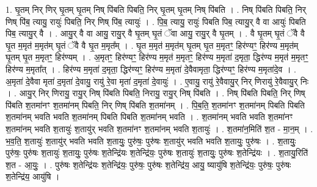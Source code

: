 \documentclass[17pt]{extarticle}
\begin{document}
1. घृ॒तम् निर् णिर् घृ॒तम् घृ॒तम् निष् पि॑बति पिबति॒ निर् घृ॒तम् घृ॒तम् निष् पि॑बति । . निष् पि॑बति पिबति॒ निर् णिष् पि॑ब॒ त्यायु॒ रायुः॑ पिबति॒ निर् णिष् पि॑ब॒ त्यायुः॑ । . पि॒ब॒ त्यायु॒ रायुः॑ पिबति पिब॒ त्यायु॒र् वै वा आयुः॑ पिबति पिब॒ त्यायु॒र् वै । . आयु॒र् वै वा आयु॒ रायु॒र् वै घृ॒तम् घृ॒तं ॅवा आयु॒ रायु॒र् वै घृ॒तम् । . वै घृ॒तम् घृ॒तं ॅवै वै घृ॒त म॒मृत॑ म॒मृत॑म् घृ॒तं ॅवै वै घृ॒त म॒मृत᳚म् । . घृ॒त म॒मृत॑ म॒मृत॑म् घृ॒तम् घृ॒त म॒मृतꣳ॒॒ हिर॑ण्यꣳ॒॒ हिर॑ण्य म॒मृत॑म् घृ॒तम् घृ॒त म॒मृतꣳ॒॒ हिर॑ण्यम् । . अ॒मृतꣳ॒॒ हिर॑ण्यꣳ॒॒ हिर॑ण्य म॒मृत॑ म॒मृतꣳ॒॒ हिर॑ण्य म॒मृता॑ द॒मृता॒ द्धिर॑ण्य म॒मृत॑ म॒मृतꣳ॒॒ हिर॑ण्य म॒मृता᳚त् । . हिर॑ण्य म॒मृता॑ द॒मृता॒ द्धिर॑ण्यꣳ॒॒ हिर॑ण्य म॒मृता॑ दे॒वैवामृता॒ द्धिर॑ण्यꣳ॒॒ हिर॑ण्य म॒मृता॑दे॒व । . अ॒मृता॑ दे॒वैवा मृता॑ द॒मृता॑ दे॒वायु॒ रायु॑ रे॒वा मृता॑ द॒मृता॑ दे॒वायुः॑ । . ए॒वायु॒ रायु॑ रे॒वैवायु॒र् निर् णिरायु॑ रे॒वैवायु॒र् निः । . आयु॒र् निर् णिरायु॒ रायु॒र् निष् पि॑बति पिबति॒ निरायु॒ रायु॒र् निष् पि॑बति । . निष् पि॑बति पिबति॒ निर् णिष् पि॑बति श॒तमा॑नꣳ श॒तमा॑नम् पिबति॒ निर् णिष् पि॑बति श॒तमा॑नम् । . पि॒ब॒ति॒ श॒तमा॑नꣳ श॒तमा॑नम् पिबति पिबति श॒तमा॑नम् भवति भवति श॒तमा॑नम् पिबति पिबति श॒तमा॑नम् भवति । . श॒तमा॑नम् भवति भवति श॒तमा॑नꣳ श॒तमा॑नम् भवति श॒तायुः॑ श॒तायु॑र् भवति श॒तमा॑नꣳ श॒तमा॑नम् भवति श॒तायुः॑ । . श॒तमा॑न॒मिति॑ श॒त - मा॒न॒म् । . भ॒व॒ति॒ श॒तायुः॑ श॒तायु॑र् भवति भवति श॒तायुः॒ पुरु॑षः॒ पुरु॑षः श॒तायु॑र् भवति भवति श॒तायुः॒ पुरु॑षः । . श॒तायुः॒ पुरु॑षः॒ पुरु॑षः श॒तायुः॑ श॒तायुः॒ पुरु॑षः श॒तेन्द्रि॑यः श॒तेन्द्रि॑यः॒ पुरु॑षः श॒तायुः॑ श॒तायुः॒ पुरु॑षः श॒तेन्द्रि॑यः । . श॒तायु॒रिति॑ श॒त - आ॒युः॒ । . पुरु॑षः श॒तेन्द्रि॑यः श॒तेन्द्रि॑यः॒ पुरु॑षः॒ पुरु॑षः श॒तेन्द्रि॑य॒ आयु॒ ष्यायु॑षि श॒तेन्द्रि॑यः॒ पुरु॑षः॒ पुरु॑षः श॒तेन्द्रि॑य॒ आयु॑षि । \newline
\end{document}
